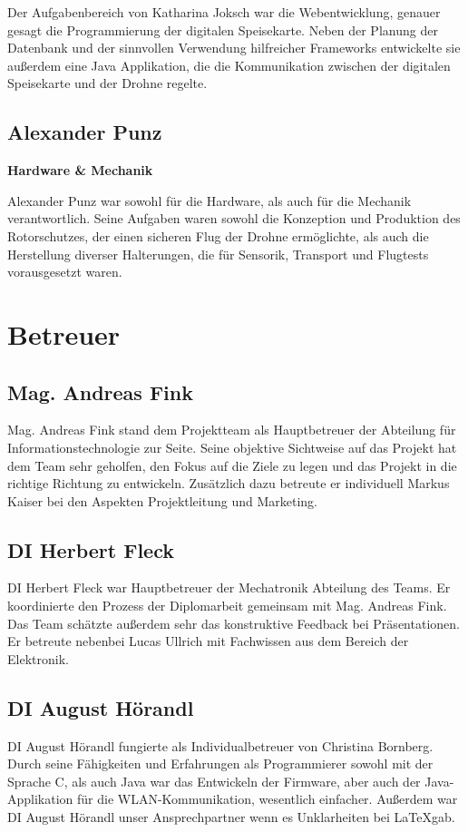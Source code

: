   Der Aufgabenbereich von Katharina Joksch war die Webentwicklung, genauer gesagt die Programmierung der digitalen Speisekarte.
  Neben der Planung der Datenbank und der sinnvollen Verwendung hilfreicher Frameworks entwickelte sie außerdem eine Java Applikation,
  die die Kommunikation zwischen der digitalen Speisekarte und der Drohne regelte.

  \subsection*{Alexander Punz}
  \textbf{Hardware \& Mechanik}

  Alexander Punz war sowohl für die Hardware, als auch für die Mechanik verantwortlich. Seine Aufgaben waren sowohl die Konzeption
  und Produktion des Rotorschutzes, der einen sicheren Flug der Drohne ermöglichte, als auch die Herstellung diverser Halterungen,
  die für Sensorik, Transport und Flugtests vorausgesetzt waren.

\section{Betreuer}
  \subsection*{Mag. Andreas Fink}
  Mag. Andreas Fink stand dem Projektteam als Hauptbetreuer der Abteilung für Informationstechnologie zur Seite.
  Seine objektive Sichtweise auf das Projekt hat dem Team sehr geholfen, den Fokus auf die Ziele zu legen und
  das Projekt in die richtige Richtung zu entwickeln.
  Zusätzlich dazu betreute er individuell Markus Kaiser bei den Aspekten Projektleitung und Marketing.

  \subsection*{DI Herbert Fleck}
  DI Herbert Fleck war Hauptbetreuer der Mechatronik Abteilung des Teams. Er koordinierte den Prozess der Diplomarbeit
  gemeinsam mit Mag. Andreas Fink. Das Team schätzte außerdem sehr das konstruktive Feedback bei Präsentationen.
  Er betreute nebenbei Lucas Ullrich mit Fachwissen aus dem Bereich der Elektronik.

  \subsection*{DI August Hörandl}
  DI August Hörandl fungierte als Individualbetreuer von Christina Bornberg. Durch seine Fähigkeiten und
  Erfahrungen als Programmierer sowohl mit der Sprache C, als auch Java war das Entwickeln der Firmware,
  aber auch der Java-Applikation für die WLAN-Kommunikation, wesentlich einfacher. Außerdem war
  DI August Hörandl unser Ansprechpartner wenn es Unklarheiten bei \LaTeX gab.

